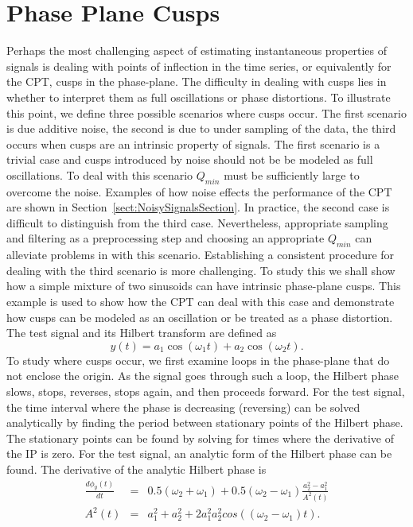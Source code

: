 \documentclass[journal,11pt,a4paper,onecolumn,draftcls]{IEEEtran}
\begin{document}
\section{Phase Plane Cusps}\label{sect:PhasePlaneCuspsSection}
Perhaps the most challenging aspect of estimating instantaneous properties of signals is dealing with points of inflection in the time series, or equivalently for the CPT, cusps in the phase-plane. The difficulty in dealing with cusps lies in whether to interpret them as full oscillations or phase distortions. To illustrate this point, we define three possible scenarios where cusps occur. The first scenario is due additive noise, the second is due to under sampling of the data, the third occurs when cusps are an intrinsic property of signals. The first scenario is a trivial case and cusps introduced by noise should not be be modeled as full oscillations. To deal with this scenario $Q_{min}$ must be sufficiently large to overcome the noise. Examples of how noise effects the performance of the CPT are shown in Section~\ref{sect:NoisySignalsSection}. In practice, the second case is difficult to distinguish from the third case. Nevertheless, appropriate sampling and filtering as a preprocessing step and choosing an appropriate $Q_{min}$ can alleviate problems in with this scenario. Establishing a consistent procedure for dealing with the third scenario is more challenging. To study this we shall show how a simple mixture of two sinusoids can have intrinsic phase-plane cusps. This example is used to show how the CPT can deal with this case and demonstrate how cusps can be modeled as an oscillation or be treated as a phase distortion. The test signal and its Hilbert transform are defined as
\begin{equation}\label{SamplingSigDef}
    y\left( t \right) = {a_1}\cos \left( {{\omega _1}t} \right) + {a_2}\cos \left( {{\omega _2}t} \right).
\end{equation}   
To study where cusps occur, we first examine loops in the phase-plane that do not enclose the origin. As the signal goes through such a loop, the Hilbert phase slows, stops, reverses, stops again, and then proceeds forward. For the test signal, the time interval where the phase is decreasing (reversing) can be solved analytically by finding the period between stationary points of the Hilbert phase. The stationary points can be found by solving for times where the derivative of the IP is zero. For the test signal, an analytic form of the Hilbert phase can be found. The derivative of the analytic Hilbert phase is 
\begin{eqnarray}
    \frac{d\phi_y(t)}{dt}&=&0.5(\omega_2 + \omega_1) + 0.5(\omega_2 - \omega_1)\frac{a_2^2-a_1^2}{A^2(t)} \\
    A^2(t) &=& a_1^2 + a_2^2 + 2a_1^2a_2^2cos((\omega_2-\omega_1)t).
\end{eqnarray}
\end{document}

